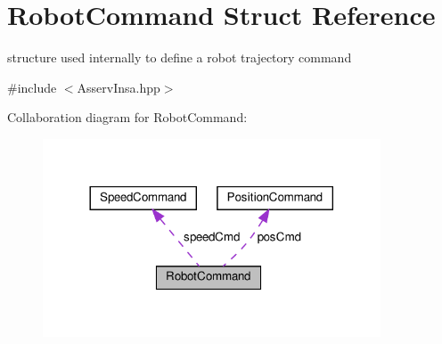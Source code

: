 \hypertarget{structRobotCommand}{}\section{Robot\+Command Struct Reference}
\label{structRobotCommand}


structure used internally to define a robot trajectory command  




{\ttfamily \#include $<$Asserv\+Insa.\+hpp$>$}



Collaboration diagram for Robot\+Command\+:
\nopagebreak
\begin{figure}[H]
\begin{center}
\leavevmode
\includegraphics[width=284pt]{structRobotCommand__coll__graph}
\end{center}
\end{figure}
